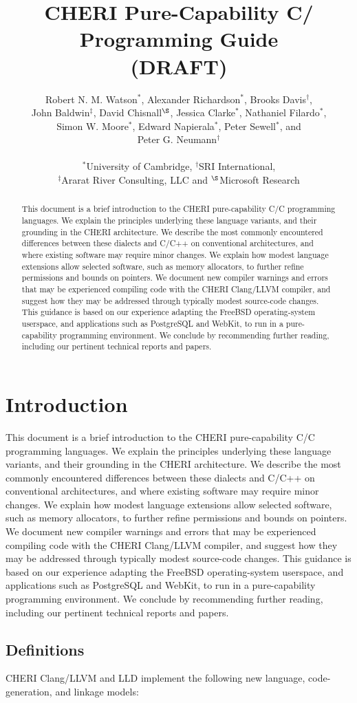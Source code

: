 \documentclass[12pt,twoside,openright,usletter]{article}
\title{CHERI Pure-Capability C/\cppInHeader{} Programming Guide \\ (DRAFT)}
\author{Robert N. M. Watson$^*$, Alexander Richardson$^*$,
  Brooks Davis$^\dagger$, \\
  John Baldwin$^\ddagger$, David Chisnall$^\S$, Jessica Clarke$^*$,
  Nathaniel Filardo$^*$, \\
  Simon W. Moore$^*$,  Edward Napierala$^*$, Peter Sewell$^*$, and \\
  Peter G. Neumann$^\dagger$ \\
  \\
  $^*$University of Cambridge, $^\dagger$SRI International, \\
  $^\ddagger$Ararat River Consulting, LLC and $^\S$Microsoft Research}
\newcommand*{\cpp}[1][]{C\textsmaller[2]{\nolinebreak[4]\hspace{-.05em}\raisebox{.45ex}{\textbf{++}}}}
\newcommand*{\purecapCOrCpp}[1]{CHERI pure-capability C/\cpp{}}
\begin{document}
\sloppy

\maketitle


%
%
\newcommand{\abstracttext}{
This document is a brief introduction to the \purecapCOrCpp{}
programming languages.
We explain the principles underlying these language variants, and their
grounding in the CHERI architecture.
We describe the most commonly encountered differences between these
dialects and C/C++ on conventional architectures, and where existing software
may require minor changes.
We explain how modest language extensions allow selected software, such
as memory allocators, to further refine permissions and bounds on pointers.
We document new compiler warnings and errors that may be experienced compiling
code with the CHERI Clang/LLVM compiler, and suggest how they may be addressed
through typically modest source-code changes.
This guidance is based on our experience adapting the FreeBSD operating-system
userspace, and applications such as PostgreSQL and WebKit, to run in a
pure-capability programming environment.
We conclude by recommending further reading, including our pertinent technical
reports and papers.
}


\begin{abstract}
\abstracttext
\end{abstract}

\newpage
\setcounter{tocdepth}{2}
\tableofcontents

\newpage

\section{Introduction}

%
%
\abstracttext{}

\subsection{Definitions}

CHERI Clang/LLVM and LLD implement the following new language,
code-generation, and linkage models:
\end{document}
